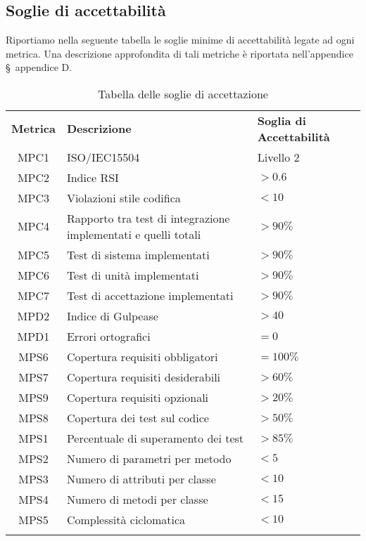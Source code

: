 \newpage

\subsection{Soglie di accettabilità}
Riportiamo nella seguente tabella le soglie minime di accettabilità legate ad ogni metrica. Una descrizione approfondita di tali metriche è riportata nell'appendice \S\ appendice D.

\begin{longtable}{| c | p{8cm} | p{2.5cm} |}
	\rowcolor{LightBlue}
	\color{white}\bfseries Metrica & \color{white}\bfseries Descrizione &\color{white}\bfseries Soglia di \newline Accettabilità \\
	MPC1 & ISO/IEC15504 & Livello 2 \\ \hline
	MPC2 & Indice RSI & $> 0.6$ \\ \hline
	MPC3 & Violazioni stile codifica & $< 10$ \\ \hline
	MPC4 & Rapporto tra test di integrazione implementati e quelli totali & $> 90\%$\\ \hline
	MPC5 & Test di sistema implementati & $> 90\%$\\ \hline
	MPC6 & Test di unità implementati & $> 90\%$\\ \hline
	MPC7 & Test di accettazione implementati & $> 90\%$\\ \hline
	MPD2 & Indice di Gulpease & $> 40$\\ \hline
	MPD1 & Errori ortografici & $= 0$\\ \hline
	MPS6 & Copertura requisiti obbligatori & $= 100\%$\\ \hline
	MPS7 & Copertura requisiti desiderabili & $> 60\%$\\ \hline
	MPS9 & Copertura requisiti opzionali & $> 20\%$\\ \hline
	MPS8 & Copertura dei test sul codice & $> 50\%$\\ \hline
	MPS1 & Percentuale di superamento dei test & $> 85\%$\\ \hline
	MPS2 & Numero di parametri per metodo & $< 5$\\ \hline
	MPS3 & Numero di attributi per classe & $< 10$\\ \hline
	MPS4 & Numero di metodi per classe & $< 15$\\ \hline
	MPS5 & Complessità ciclomatica & $< 10$ \\ \hline
	\caption{Tabella delle soglie di accettazione}
\end{longtable}


